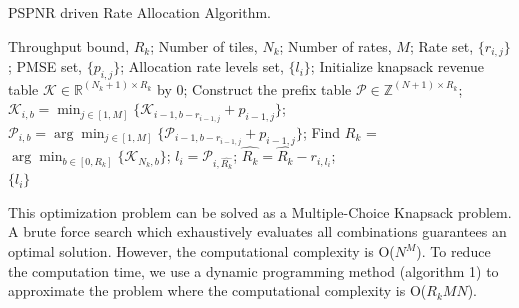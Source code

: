 \begin{algorithm}[t]
\caption{ PSPNR driven Rate Allocation Algorithm.}
\label{alg:Framwork}
\begin{algorithmic}[1]
\Require
Throughput bound, $R_k$;
Number of tiles, $N_k$;
Number of rates, $M$;
Rate set, $\{r_{i,j}\}$;
PMSE set, $\{p_{i,j}\}$;
\Ensure
Allocation rate levels set, $\{l_i\}$;
\State Initialize knapsack revenue table $\mathcal{K}\in \mathbb{R}^{(N_k+1)\times R_k}$ by 0;
\State Construct the prefix table $\mathcal{P}\in \mathbb{Z}^{(N+1)\times R_k}$;
    \State $\mathcal{K}_{i,b} = \min_{j\in[1,M]}\{\mathcal{K}_{i-1,b-r_{i-1,j}} + p_{i-1,j}\}$;
    \State $\mathcal{P}_{i,b} = \arg\min_{j\in[1,M]}\{\mathcal{P}_{i-1,b-r_{i-1,j}} + p_{i-1,j}\}$;
  \EndFor
\EndFor
\State Find $\hat{R_k}$ = $\arg\min_{b\in [0,R_k]} \{\mathcal{K}_{N_k,b}\}$;
  \State $l_i = \mathcal{P}_{i,\hat{R_k}}$;
  \State $\hat{R_k} = \hat{R_k} - r_{i,l_i}$;
\EndFor \\
\Return $\{l_i\}$
\end{algorithmic}
\end{algorithm}

This optimization problem can be solved as a Multiple-Choice Knapsack problem. A brute force search which exhaustively evaluates all combinations guarantees an optimal solution. However, the computational complexity is O($N^M$). To reduce the computation time, we use a dynamic programming method (algorithm 1) to approximate the problem where the computational complexity is O($R_kMN$).
